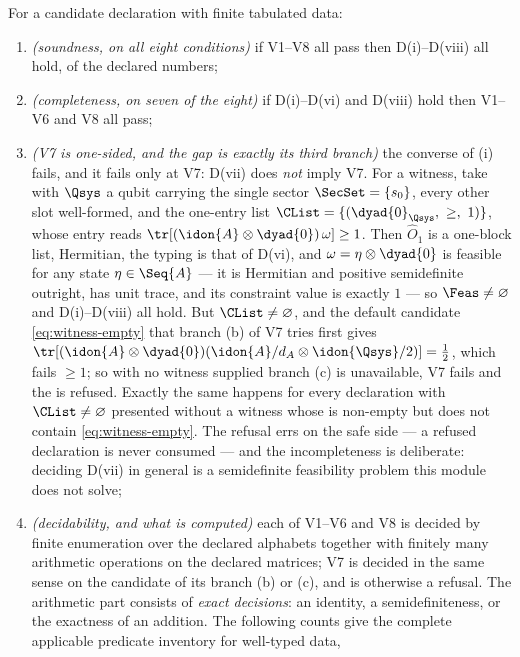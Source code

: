 \begin{theorem}
\label{thm:validator-soundness}
For a candidate declaration with finite tabulated data:
\begin{enumerate}[label=(\roman*),leftmargin=2.2em]
\item \emph{(soundness, on all eight conditions)} if V1--V8 all
pass then D(i)--D(viii) all hold, of the declared numbers;
\item \emph{(completeness, on seven of the eight)} if D(i)--D(vi)
and D(viii) hold then V1--V6 and V8 all pass;
\item \emph{(V7 is one-sided, and the gap is exactly its third branch)} the
converse of (i) fails, and it fails only at V7: D(vii) does \emph{not} imply
V7. For a witness, take  with $\Qsys$ a qubit
carrying the single sector $\SecSet=\{s_0\}$, every other slot well-formed,
and the one-entry list
$\CList=\{(\dyad{0}_{\Qsys},\ \ge,\ 1)\}$, whose entry reads
$\tr[(\idon{A}\otimes\dyad{0})\,\omega]\ge1$. Then $\hat O_1$ is a
one-block list, Hermitian, the typing is that of D(vi), and
$\omega=\eta\otimes\dyad{0}$ is feasible for any state $\eta\in\Seq{A}$ --- it
is Hermitian and positive semidefinite outright, has unit trace, and its
constraint value is exactly $1$ --- so $\Feas\ne\varnothing$ and D(i)--D(viii)
all hold. But $\CList\ne\varnothing$, and the default candidate
\eqref{eq:witness-empty} that branch (b) of V7 tries first gives
$\tr[(\idon{A}\otimes\dyad{0})(\idon{A}/d_A\otimes\idon{\Qsys}/2)]=\tfrac12$,
which fails $\ge1$; so with no witness supplied branch (c) is unavailable, V7
fails and the  is refused. Exactly the same
happens for every declaration with $\CList\ne\varnothing$ presented without a
witness whose  is non-empty but does not contain
\eqref{eq:witness-empty}. The refusal errs on the safe side --- a refused
declaration is never consumed --- and the incompleteness is deliberate: deciding D(vii) in general is a
semidefinite feasibility problem this module does not solve;
\item \emph{(decidability, and what is computed)} each of V1--V6 and V8 is
decided by finite enumeration over the declared alphabets together with
finitely many arithmetic operations on the declared matrices; V7 is decided in
the same sense on the candidate of its branch (b) or (c), and is otherwise a
refusal. The arithmetic part consists of \emph{exact decisions}: an
identity, a semidefiniteness, or the exactness of an addition. The following
counts give the complete applicable predicate inventory for well-typed data,

\end{enumerate}
\end{theorem}
